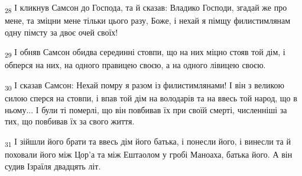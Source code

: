 \begin{tcolorbox}
\textsubscript{28} І кликнув Самсон до Господа, та й сказав: Владико Господи, згадай же про мене, та зміцни мене тільки цього разу, Боже, і нехай я пімщу филистимлянам одну пімсту за двоє очей своїх!
\end{tcolorbox}
\begin{tcolorbox}
\textsubscript{29} І обняв Самсон обидва серединні стовпи, що на них міцно стояв той дім, і обперся на них, на одного правицею своєю, а на одного лівицею своєю.
\end{tcolorbox}
\begin{tcolorbox}
\textsubscript{30} І сказав Самсон: Нехай помру я разом із филистимлянами! І він з великою силою сперся на стовпи, і впав той дім на володарів та на ввесь той народ, що в ньому... І були ті померлі, що він повбивав їх при своїй смерті, численніші за тих, що повбивав їх за свого життя.
\end{tcolorbox}
\begin{tcolorbox}
\textsubscript{31} І зійшли його брати та ввесь дім його батька, і понесли його, і винесли та й поховали його між Цор'а та між Ештаолом у гробі Маноаха, батька його. А він судив Ізраїля двадцять літ.
\end{tcolorbox}
